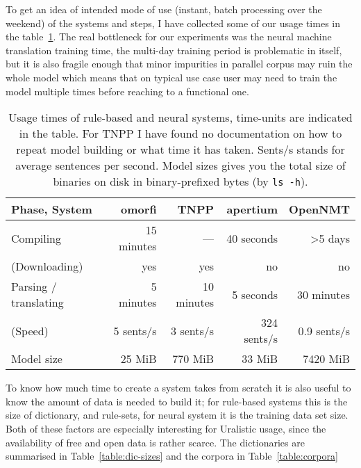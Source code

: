 \documentclass{flammie}
\begin{document}
To get an idea of intended mode of use (instant, batch processing over the
weekend) of the systems and steps, I have collected some of our usage times in
the table~\ref{table:times}. The real bottleneck for our experiments was the
neural machine translation training time, the multi-day training period is
problematic in itself, but it is also fragile enough that minor impurities in
parallel corpus may ruin the whole model which means that on typical use case
user may need to train the model multiple times before reaching to a functional
one.

\begin{table}
\begin{centering}
    \begin{tabular}{lrrrr}
        \toprule
        Phase, System & \bf omorfi & \bf TNPP & \bf apertium & \bf OpenNMT \\
        \midrule
        Compiling & 15 minutes & --- & 40 seconds & >5 days \\
        (Downloading) & yes & yes & no & no\\
        Parsing / translating & 5 minutes & 10 minutes  & 5 seconds & 30 minutes \\
        (Speed) & 5 sents/s & 3 sents/s & 324 sents/s & 0.9 sents/s \\
        \midrule
        Model size & 25 MiB & 770 MiB & 33 MiB & 7420 MiB \\
        \bottomrule
    \end{tabular}
    \caption{Usage times of rule-based and neural systems, time-units are
    indicated in the table. For TNPP I have found no documentation on how to
    repeat model building or what time it has taken. Sents/s stands for
    average sentences per second. Model sizes gives you the total size of
    binaries on disk in binary-prefixed bytes (by \texttt{ls -h}).
\label{table:times}}
\end{centering}
\end{table}

To know how much time to create a system takes from scratch it is also useful to
know the amount of data is needed to build it; for rule-based systems this is
the size of dictionary, and rule-sets, for neural system it is the training
data set size. Both of these factors are especially interesting for Uralistic
usage, since the availability of free and open data is rather scarce. The
dictionaries are summarised in Table~\ref{table:dic-sizes} and the corpora in
Table~\ref{table:corpora}
\end{document}
